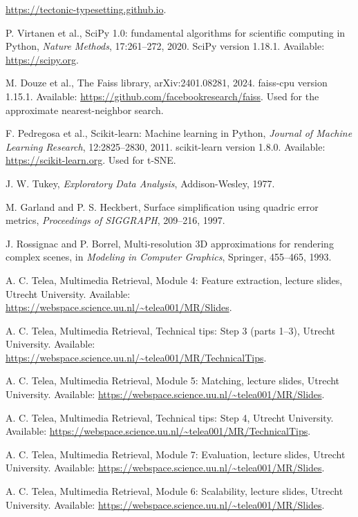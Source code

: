 \documentclass[10pt,a4paper]{article}
\begin{document}
\begin{description}[leftmargin=2.2em,labelwidth=2em,style=sameline]
  \url{https://tectonic-typesetting.github.io}.
\item[{[12]}] P. Virtanen et al., SciPy 1.0: fundamental algorithms for scientific computing in Python, \emph{Nature Methods},
  17:261--272, 2020. SciPy version 1.18.1. Available: \url{https://scipy.org}.
\item[{[13]}] M. Douze et al., The Faiss library, arXiv:2401.08281, 2024. faiss-cpu version 1.15.1. Available:
  \url{https://github.com/facebookresearch/faiss}. Used for the approximate nearest-neighbor search.
\item[{[14]}] F. Pedregosa et al., Scikit-learn: Machine learning in Python, \emph{Journal of Machine Learning Research},
  12:2825--2830, 2011. scikit-learn version 1.8.0. Available: \url{https://scikit-learn.org}. Used for t-SNE.
\item[{[15]}] J. W. Tukey, \emph{Exploratory Data Analysis}, Addison-Wesley, 1977.
\item[{[16]}] M. Garland and P. S. Heckbert, Surface simplification using quadric error metrics, \emph{Proceedings of SIGGRAPH},
  209--216, 1997.
\item[{[17]}] J. Rossignac and P. Borrel, Multi-resolution 3D approximations for rendering complex scenes, in \emph{Modeling in
  Computer Graphics}, Springer, 455--465, 1993.
\item[{[18]}] A. C. Telea, Multimedia Retrieval, Module 4: Feature extraction, lecture slides, Utrecht University. Available:
  \url{https://webspace.science.uu.nl/~telea001/MR/Slides}.
\item[{[19]}] A. C. Telea, Multimedia Retrieval, Technical tips: Step 3 (parts 1--3), Utrecht University. Available:
  \url{https://webspace.science.uu.nl/~telea001/MR/TechnicalTips}.
\item[{[20]}] A. C. Telea, Multimedia Retrieval, Module 5: Matching, lecture slides, Utrecht University. Available:
  \url{https://webspace.science.uu.nl/~telea001/MR/Slides}.
\item[{[21]}] A. C. Telea, Multimedia Retrieval, Technical tips: Step 4, Utrecht University. Available:
  \url{https://webspace.science.uu.nl/~telea001/MR/TechnicalTips}.
\item[{[22]}] A. C. Telea, Multimedia Retrieval, Module 7: Evaluation, lecture slides, Utrecht University. Available:
  \url{https://webspace.science.uu.nl/~telea001/MR/Slides}.
\item[{[23]}] A. C. Telea, Multimedia Retrieval, Module 6: Scalability, lecture slides, Utrecht University. Available:
  \url{https://webspace.science.uu.nl/~telea001/MR/Slides}.

\end{description}
\end{document}
